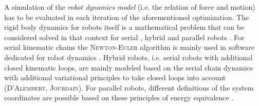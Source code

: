 \documentclass[runningheads]{llncs}
\begin{document}
A simulation of the \emph{robot dynamics model} (i.e. the relation of force and motion) has to be evaluated in each iteration of the aforementioned optimization.
The rigid body dynamics for robots itself is a mathematical problem that can be considered solved in that context for serial \cite{KhalilDom2002}, hybrid \cite{KhalilCre1997,ShiMcP2000,FisettePosSasSam2002,SaminFis2013,Docquier2013} and parallel robots \cite{Merlet2006,BriotKha2015,DoThanhKotHeiOrt2009b,AbdellatifHei2009}.
For serial kinematic chains the \textsc{Newton-Euler} algorithm is mainly used in software dedicated for robot dynamics \cite{KhalilCre1997,KhalilVijKhoMuk2014,SaminFis2013}.
Hybrid robots, i.e. serial robots with additional closed kinematic loops, are mainly modeled based on the serial chain dynamics with additional variational principles to take closed loops into account \cite{SaminFis2013} (\textsc{D'Alembert}, \textsc{Jourdain}). 
For parallel robots, different definitions of the system coordinates are possible based on these principles of energy equivalence \cite{BriotKha2015,DoThanhKotHeiOrt2009b,AbdellatifHei2009}.
\end{document}
